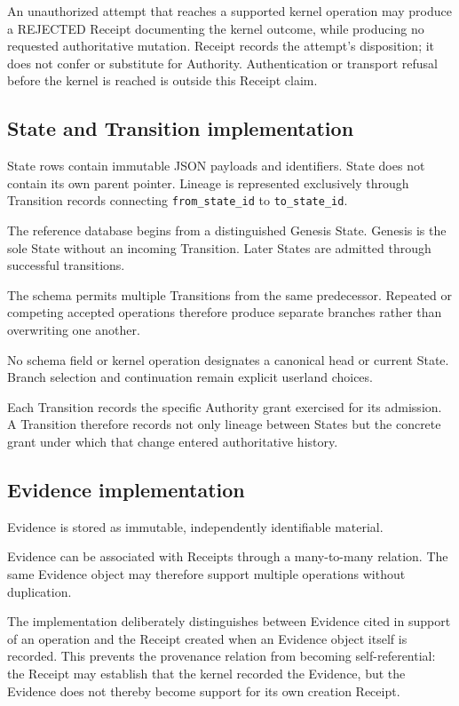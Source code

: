 \documentclass[11pt]{article}
\begin{document}
An unauthorized attempt that reaches a supported kernel operation may produce a REJECTED Receipt documenting the kernel outcome, while producing no requested authoritative mutation. Receipt records the attempt's disposition; it does not confer or substitute for Authority. Authentication or transport refusal before the kernel is reached is outside this Receipt claim.

\subsection{State and Transition implementation}

State rows contain immutable JSON payloads and identifiers. State does not contain its own parent pointer. Lineage is represented exclusively through Transition records connecting \texttt{from\_state\_id} to \texttt{to\_state\_id}.

The reference database begins from a distinguished Genesis State. Genesis is the sole State without an incoming Transition. Later States are admitted through successful transitions.

The schema permits multiple Transitions from the same predecessor. Repeated or competing accepted operations therefore produce separate branches rather than overwriting one another.

No schema field or kernel operation designates a canonical head or current State. Branch selection and continuation remain explicit userland choices.

Each Transition records the specific Authority grant exercised for its admission. A Transition therefore records not only lineage between States but the concrete grant under which that change entered authoritative history.

\subsection{Evidence implementation}

Evidence is stored as immutable, independently identifiable material.

Evidence can be associated with Receipts through a many-to-many relation. The same Evidence object may therefore support multiple operations without duplication.

The implementation deliberately distinguishes between Evidence cited in support of an operation and the Receipt created when an Evidence object itself is recorded. This prevents the provenance relation from becoming self-referential: the Receipt may establish that the kernel recorded the Evidence, but the Evidence does not thereby become support for its own creation Receipt.
\end{document}
